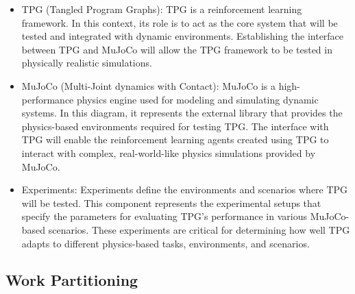 \documentclass[12pt]{article}
\begin{document}
\begin{itemize}
  \item TPG (Tangled Program Graphs): TPG is a reinforcement learning framework. In this context, its role is to act as the core system that will be tested and integrated with dynamic environments. Establishing the interface between TPG and MuJoCo will allow the TPG framework to be tested in physically realistic simulations.
  \item MuJoCo (Multi-Joint dynamics with Contact): MuJoCo is a high-performance physics engine used for modeling and simulating dynamic systems. In this diagram, it represents the external library that provides the physics-based environments required for testing TPG. The interface with TPG will enable the reinforcement learning agents created using TPG to interact with complex, real-world-like physics simulations provided by MuJoCo.
  \item Experiments: Experiments define the environments and scenarios where TPG will be tested. This component represents the experimental setups that specify the parameters for evaluating TPG’s performance in various MuJoCo-based scenarios. These experiments are critical for determining how well TPG adapts to different physics-based tasks, environments, and scenarios.
\end{itemize}

\subsection{Work Partitioning}
\end{document}
